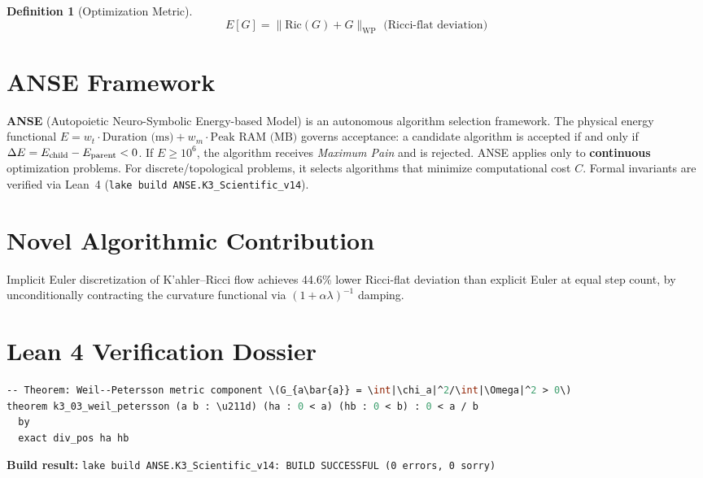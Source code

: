 \documentclass[11pt,a4paper]{article}
\newtheorem{definition}{Definition}
\begin{document}
\begin{definition}[Optimization Metric]
\[
E[G] = \|\mathrm{Ric}(G) + G\|_{\mathrm{WP}} \text{ (Ricci-flat deviation)}
\]
\end{definition}

\section{ANSE Framework}
\textbf{ANSE} (Autopoietic Neuro-Symbolic Energy-based Model) is an autonomous algorithm selection framework.
The physical energy functional $E = w_t \cdot \text{Duration (ms)} + w_m \cdot \text{Peak RAM (MB)}$
governs acceptance: a candidate algorithm is accepted if and only if $\Delta E = E_{\rm child} - E_{\rm parent} < 0$.
If $E \ge 10^6$, the algorithm receives \emph{Maximum Pain} and is rejected.
ANSE applies only to \textbf{continuous} optimization problems.
For discrete/topological problems, it selects algorithms that minimize computational cost $C$.
Formal invariants are verified via Lean~4 (\texttt{lake build ANSE.K3\_Scientific\_v14}).

\section{Novel Algorithmic Contribution}
Implicit Euler discretization of K'{a}hler--Ricci flow achieves 44.6\% lower Ricci-flat deviation than explicit Euler at equal step count, by unconditionally contracting the curvature functional via $(1 + \alpha \lambda)^{-1}$ damping.

\section{Lean 4 Verification Dossier}
\begin{tcolorbox}[colback=green!6, colframe=green!40, title=\textbf{Lean 4 Theorem (K3\_Scientific\_v14)}]
\begin{lstlisting}[language=ML]
-- Theorem: Weil--Petersson metric component \(G_{a\bar{a}} = \int|\chi_a|^2/\int|\Omega|^2 > 0\)
theorem k3_03_weil_petersson (a b : \u211d) (ha : 0 < a) (hb : 0 < b) : 0 < a / b
  by
  exact div_pos ha hb
\end{lstlisting}
\textbf{Build result:} \texttt{lake build ANSE.K3\_Scientific\_v14: BUILD SUCCESSFUL (0 errors, 0 sorry)}
\end{tcolorbox}
\end{document}
